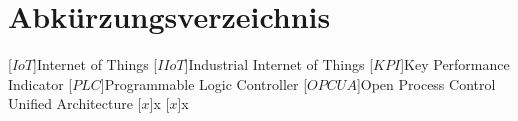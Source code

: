 \clearpage
\chapter*{Abkürzungsverzeichnis}\label{abkuerzungsverzeichnis}
\begin{acronym}[YTM]
\setlength{\itemsep}{-\parsep}

[$IoT$]{\hspace{1cm}Internet of Things}
[$IIoT$]{\hspace{1cm}Industrial Internet of Things}
[$KPI$]{\hspace{1cm}Key Performance Indicator}
[$PLC$]{\hspace{1cm}Programmable Logic Controller}
[$OPC UA$]{\hspace{1cm}Open Process Control Unified Architecture}
\acro{}[$x$]{\hspace{1cm}x}
\acro{}[$x$]{\hspace{1cm}x}


\end{acronym}
